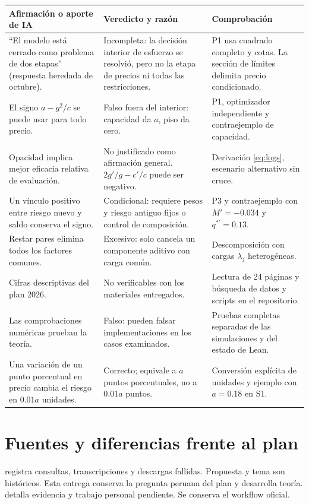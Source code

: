 \documentclass[11pt]{article}
\theoremstyle{definition}\newtheorem{assumption}{Supuesto}
\begin{document}
\begin{longtable}{p{.30\linewidth}p{.29\linewidth}p{.32\linewidth}}
\toprule Afirmación o aporte de IA & Veredicto y razón & Comprobación\\\midrule
\endhead
``El modelo está cerrado como problema de dos etapas'' (respuesta heredada de octubre). &
Incompleta: la decisión interior de esfuerzo se resolvió, pero no la etapa
de precios ni todas las restricciones. & P1 usa cuadrado completo y cotas.
La sección de límites delimita precio condicionado.\\
El signo $a-g^2/c$ se puede usar para todo precio. &
Falso fuera del interior: capacidad da $a$, piso da cero. &
P1, optimizador independiente y contraejemplo de capacidad.\\
Opacidad implica mejor eficacia relativa de evaluación. &
No justificado como afirmación general. $2g'/g-c'/c$ puede ser negativo. &
Derivación \eqref{eq:logs}, escenario alternativo sin cruce.\\
Un vínculo positivo entre riesgo nuevo y saldo conserva el signo. &
Condicional: requiere pesos y riesgo antiguo fijos o control de composición. &
P3 y contraejemplo con $M'=-0.034$ y $q^{*\prime}=0.13$.\\
Restar pares elimina todos los factores comunes. &
Excesivo: solo cancela un componente aditivo con carga común. &
Descomposición con cargas $\lambda_j$ heterogéneas.\\
Cifras descriptivas del plan 2026. &
No verificables con los materiales entregados. &
Lectura de 24 páginas y búsqueda de datos y scripts en el repositorio.\\
Las comprobaciones numéricas prueban la teoría. &
Falso: pueden falsar implementaciones en los casos examinados. &
Pruebas completas separadas de las simulaciones y del estado de Lean.\\
Una variación de un punto porcentual en precio cambia el riesgo en
$0.01a$ unidades. &
Correcto; equivale a $a$ puntos porcentuales, no a $0.01a$ puntos. &
Conversión explícita de unidades y ejemplo con $a=0.18$ en S1.\\
\bottomrule
\end{longtable}

\section{Fuentes y diferencias frente al plan}
 registra consultas, transcripciones y descargas fallidas.
Propuesta y tema son históricos. Esta entrega conserva la pregunta peruana
del plan y desarrolla teoría.  detalla evidencia y
trabajo personal pendiente. Se conserva el workflow oficial.
\end{document}
